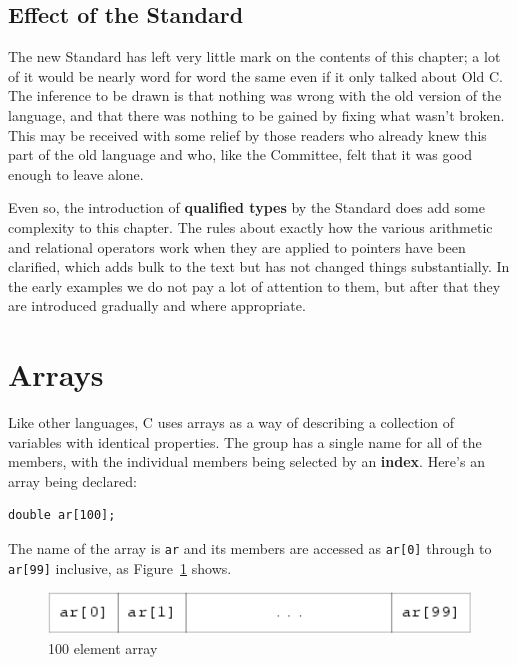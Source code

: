   

  \subsection{Effect of the Standard}
   

   The new Standard has left very little mark on the contents of this
    chapter; a lot of it would be nearly word for word the same even if it
    only talked about Old C. The inference to be drawn is that nothing was
    wrong with the old version of the language, and that there was nothing
    to be gained by fixing what wasn't broken. This may be received with
    some relief by those readers who already knew this part of the old
    language and who, like the Committee, felt that it was good enough to
    leave alone.


   Even so, the introduction of \textbf{qualified types} by the
    Standard does add some complexity to this chapter. The rules about
    exactly how the various arithmetic and relational operators work when
    they are applied to pointers have been clarified, which adds bulk to the
    text but has not changed things substantially. In the early examples we
    do not pay a lot of attention to them, but after that they are
    introduced gradually and where appropriate.


  

 
        \section{Arrays}
        

  

  Like other languages, C uses arrays as a way of describing a collection
   of variables with identical properties. The group has a single name for
   all of the members, with the individual members being selected by an
   \textbf{index}. Here's an array being declared:


  \begin{Verbatim}
double ar[100];
\end{Verbatim}

  The name of the array is \texttt{ar} and its members are accessed
   as \texttt{ar[0]} through to \texttt{ar[99]} inclusive, as
   Figure~\ref{fig:arr} shows.


   \begin{figure}[htb]\centering
     \includegraphics[type=pdf,read=.pdf,ext=.pdf,scale=0.9]{figure/5.1_arr}
     \caption*{Diagram showing an array consisting of elements labelled 'ar[0]',           'ar[1]', etc., up to 'ar[99]'.}
     \caption{\label{fig:arr}100 element array}
   \end{figure}



